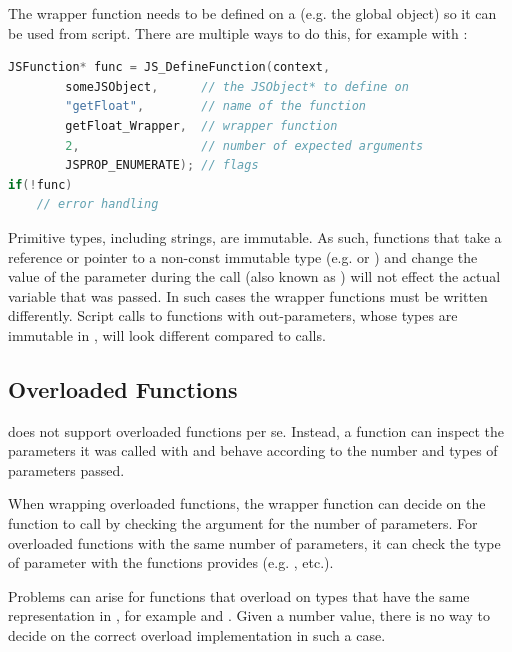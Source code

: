 The wrapper function needs to be defined on a  (e.g. the global object) so it can be used from script. There are multiple ways to do this, for example with :

\SingleSpacing
\begin{lstlisting}[language=C++, caption=Defining a function]
JSFunction* func = JS_DefineFunction(context, 
        someJSObject,      // the JSObject* to define on
        "getFloat",        // name of the function
        getFloat_Wrapper,  // wrapper function
        2,                 // number of expected arguments 
        JSPROP_ENUMERATE); // flags
if(!func)
	// error handling
\end{lstlisting}
\OnehalfSpacing

Primitive types, including strings, are immutable. As such, functions that take a reference or pointer to a non-const immutable type (e.g.  or ) and change the value of the parameter during the call (also known as ) will not effect the actual  variable that was passed. In such cases the wrapper functions must be written differently. Script calls to  functions with out-parameters, whose types are immutable in , will look different compared to  calls.

\subsection{Overloaded Functions}
\label{sec:OverloadedFunctions}

 does not support overloaded functions per se. Instead, a function can inspect the parameters it was called with and behave according to the number and types of parameters passed.

When wrapping overloaded functions, the wrapper function can decide on the  function to call by checking the  argument for the number of parameters. For overloaded functions with the same number of parameters, it can check the type of parameter with the functions  provides (e.g. , etc.).

Problems can arise for functions that overload on  types that have the same representation in , for example  and . Given a number value, there is no way to decide on the correct overload implementation in such a case.

